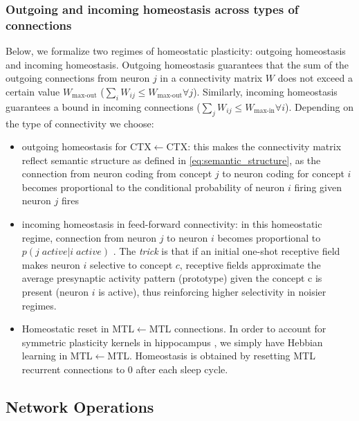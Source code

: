 \documentclass{article}
\begin{document}
\subsubsection*{Outgoing and incoming homeostasis across types of connections}
Below, we formalize two regimes of homeostatic plasticity: outgoing homeostasis and incoming homeostasis. Outgoing homeostasis guarantees that the sum of the outgoing connections from neuron $j$ in a connectivity matrix $W$ does not exceed a certain value $W_\textrm{max-out}$ ($\sum_iW_{ij} \leq W_\textrm{max-out} \forall j$). Similarly, incoming homeostasis guarantees a bound in incoming connections ($\sum_jW_{ij} \leq W_\textrm{max-in} \forall i$). Depending on the type of connectivity we choose:
\begin{itemize}
    \item outgoing homeostasis for CTX$\leftarrow$CTX: this makes the connectivity matrix reflect semantic structure as defined in \eqref{eq:semantic_structure}, as the connection from neuron coding from concept $j$ to neuron coding for concept $i$ becomes proportional to the conditional probability of neuron $i$ firing given neuron $j$ fires 
    \item incoming homeostasis in feed-forward connectivity: in this homeostatic regime, connection from neuron $j$ to neuron $i$ becomes proportional to $p(j \; \textit{active} | i\; \textit{active})$ . The \textit{trick} is that if an initial one-shot receptive field makes neuron $i$ selective to concept $c$, receptive fields approximate the average presynaptic activity pattern (prototype) given the concept c is present (neuron $i$ is active), thus reinforcing higher selectivity in noisier regimes.
    \item Homeostatic reset in MTL$\leftarrow$MTL connections. In order to account for symmetric plasticity kernels in hippocampus , we simply have Hebbian learning in MTL$\leftarrow$MTL. Homeostasis is obtained by resetting MTL recurrent connections to 0 after each sleep cycle.
\end{itemize}
\subsection*{Network Operations}
\end{document}
